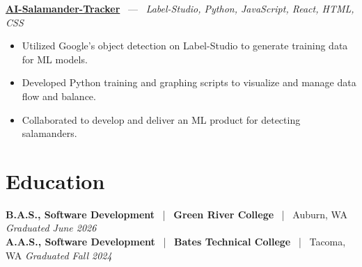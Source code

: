 \documentclass[10pt, letterpaper]{article}
\newcommand{\jobhead}[4]{%
  \vspace{5pt}%
  {\bfseries\color{dark}#1}%
  ~{\color{light}|}~%
  {\bfseries\color{navy}#2}%
  ~{\color{light}|}~%
  {\color{light}#3}%
  \hfill{\color{light}\small\textit{#4}}\\[-2pt]%
}
\newcommand{\projhead}[3]{%
  \vspace{5pt}%
  {\bfseries\color{dark}\href{#2}{#1}}%
  ~{\color{light}---}~%
  {\color{light}\small\textit{#3}}\\[-2pt]%
}
\begin{document}
\projhead{AI-Salamander-Tracker}{https://github.com/xavierb117/Salamander-Tracker-YOLO}{Label-Studio, Python, JavaScript, React, HTML, CSS}
\begin{itemize}
  \item Utilized Google's object detection on Label-Studio to generate training data for ML models.
  \item Developed Python training and graphing scripts to visualize and manage data flow and balance.
  \item Collaborated to develop and deliver an ML product for detecting salamanders.
\end{itemize}

\section{Education}

\jobhead{B.A.S., Software Development}{Green River College}{Auburn, WA}{Graduated June 2026}
\jobhead{A.A.S., Software Development}{Bates Technical College}{Tacoma, WA}{Graduated Fall 2024}
\end{document}
